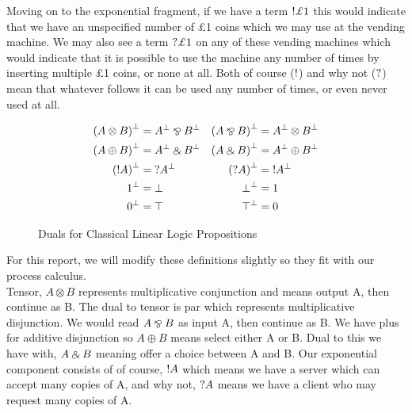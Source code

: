 \noindent
Moving on to the exponential fragment, if we have a term $\ofc \pounds 1$ this would indicate that we have an unspecified 
number of \pounds 1 coins which we may use at the vending machine. We may also see a term $\whynot \pounds 1$ on any of 
these vending machines which would indicate that it is possible to use the machine any number of times by inserting multiple 
\pounds 1 coins, or none at all. Both of course ($\textrm{!}$) and why not ($\textrm{?}$) mean that whatever follows it can be used any 
number of times, or even never used at all. \\

\begin{figure}
  \begin{align*}
    \negg{(A \otimes B)} &= \negg{A} \parr \negg{B} & \negg{(A \parr B)} &= \negg{A} \otimes \negg{B} \\
    \negg{(A \oplus B)} &= \negg{A} \with \negg{B} & \negg{(A \with B)} &= \negg{A} \oplus \negg{B} \\
    \negg{(\ofc A)} &= \whynot \negg{A} & \negg{(\whynot A)} &= \ofc \negg{A} \\
    \negg{1} &= \bot & \negg{\bot} &= 1 \\
    \negg{0} &= \top & \negg{\top} &= 0
  \end{align*}
  \caption{Duals for Classical Linear Logic Propositions}
  \label{fig: duals}
\end{figure}

\noindent
For this report, we will modify these definitions slightly so they fit with our process calculus. \\

\noindent
Tensor, $A \otimes B$ represents multiplicative conjunction and means output A, then continue as B. The dual to tensor 
is par which represents multiplicative disjunction. We would read $A \mathbin{\bindnasrepma} B$ as input A, then continue as B. 
We have plus for additive disjunction so $A \oplus B$ means select either A or B.  Dual to this we have with, 
$A \mathbin{\binampersand} B$ meaning offer a choice between A and B. 
Our exponential component consists of of course, $\textrm{!} A$ which means we have a server which can accept many 
copies of A, and why not, $\textrm{?} A$ means we have a client who may request many copies of A. \\

